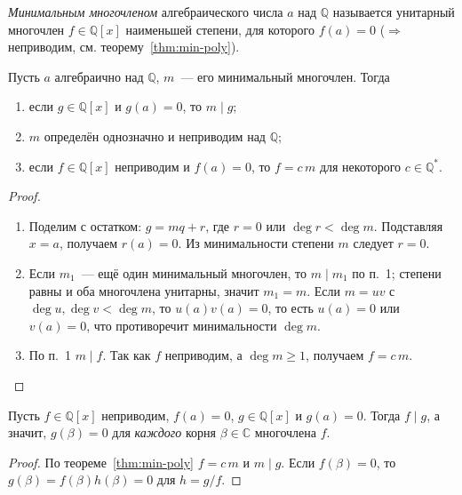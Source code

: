 \documentclass[12pt]{article}
\begin{document}
	\begin{definition}\label{def:min-poly}
		\emph{Минимальным многочленом} алгебраического числа $a$ над $\mathbb{Q}$ называется унитарный многочлен $f \in \mathbb{Q}[x]$ наименьшей степени, для которого $f(a) = 0$ ($\Rightarrow$ неприводим, см. теорему~\ref{thm:min-poly}).
	\end{definition}

	\begin{theorem}\label{thm:min-poly}
		Пусть $a$ алгебраично над $\mathbb{Q}$, $m$~--- его минимальный многочлен. Тогда
		\begin{enumerate}
			\item если $g \in \mathbb{Q}[x]$ и $g(a) = 0$, то $m \mid g$;
			\item $m$ определён однозначно и неприводим над $\mathbb{Q}$;
			\item если $f \in \mathbb{Q}[x]$ неприводим и $f(a) = 0$, то $f = c\,m$ для некоторого $c \in \mathbb{Q}^*$.
		\end{enumerate}
	\end{theorem}

	\begin{proof}
		\begin{enumerate}
			\item Поделим с остатком: $g = mq + r$, где $r = 0$ или $\deg r < \deg m$. Подставляя $x = a$, получаем $r(a) = 0$. Из минимальности степени $m$ следует $r = 0$.
			\item Если $m_1$~--- ещё один минимальный многочлен, то $m \mid m_1$ по п.~1; степени равны и оба многочлена унитарны, значит $m_1 = m$. Если $m = uv$ с $\deg u, \deg v < \deg m$, то $u(a)v(a) = 0$, то есть $u(a) = 0$ или $v(a) = 0$, что противоречит минимальности $\deg m$.
			\item По п.~1 $m \mid f$. Так как $f$ неприводим, а $\deg m \geqslant 1$, получаем $f = c\,m$.
		\end{enumerate}
	\end{proof}

	\begin{corollary}\label{cor:conjugates}
		Пусть $f \in \mathbb{Q}[x]$ неприводим, $f(a) = 0$, $g \in \mathbb{Q}[x]$ и $g(a) = 0$. Тогда $f \mid g$, а значит, $g(\beta) = 0$ для \emph{каждого} корня $\beta \in \mathbb{C}$ многочлена $f$.
	\end{corollary}

	\begin{proof}
		По теореме~\ref{thm:min-poly} $f = c\,m$ и $m \mid g$. Если $f(\beta) = 0$, то $g(\beta) = f(\beta)h(\beta) = 0$ для $h = g/f$.
	\end{proof}
\end{document}
